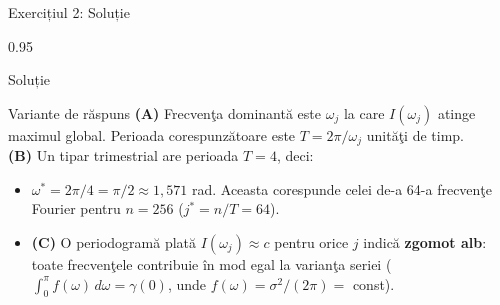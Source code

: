 \documentclass[9pt, aspectratio=169, t]{beamer}
\begin{document}
\begin{frame}{Exercițiul 2: Soluție}
    \begin{cminipage}{0.95\textwidth}
    \begin{exampleblock}{Soluție}
        {\small
        \begin{block}{Variante de răspuns}
        \textcolor{MainBlue}{\textbf{(A)}} Frecvenţa dominantă este $\omega_j$ la care $I(\omega_j)$ atinge maximul global. Perioada corespunzătoare este $T = 2\pi / \omega_j$ unităţi de timp.\\[3pt]
        \textcolor{MainBlue}{\textbf{(B)}} Un tipar trimestrial are perioada $T = 4$, deci:
        \end{block}
        \begin{itemize}\setlength{\itemsep}{0pt}
            \item $\omega^* = 2\pi/4 = \pi/2 \approx 1{,}571$ rad.
            Aceasta corespunde celei de-a 64-a frecvenţe Fourier pentru $n = 256$ ($j^* = n/T = 64$).
            \item \textcolor{MainBlue}{\textbf{(C)}} O periodogramă plată $I(\omega_j) \approx c$ pentru orice $j$ indică \textbf{zgomot alb}: toate frecvenţele contribuie în mod egal la varianţa seriei ($\int_0^\pi f(\omega)\,d\omega = \gamma(0)$, unde $f(\omega) = \sigma^2/(2\pi) = $ const).
        \end{itemize}
        }
    \end{exampleblock}
    \end{cminipage}
\end{frame}
\end{document}
